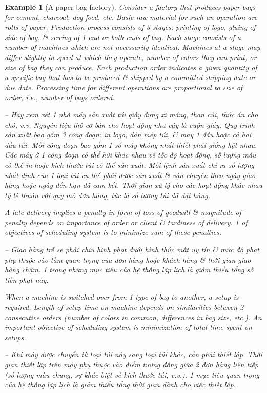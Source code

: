\documentclass{article}
\newtheorem{example}{Example}
\begin{document}
\begin{itemize}
\begin{itemize}
        \begin{example}[A paper bag factory]
            Consider a factory that produces paper bags for cement, charcoal, dog food, etc. Basic raw material for such an operation are rolls of paper. Production process consists of 3 stages: printing of logo, gluing of side of bag, \& sewing of 1 end or both ends of bag. Each stage consists of a number of machines which are not necessarily identical. Machines at a stage may differ slightly in speed at which they operate, number of colors they can print, or size of bag they can produce. Each production order indicates a given quantity of a specific bag that has to be produced \& shipped by a committed shipping date or due date. Processing time for different operations are proportional to size of order, i.e., number of bags ordered.

            -- Hãy xem xét 1 nhà máy sản xuất túi giấy đựng xi măng, than củi, thức ăn cho chó, v.v. Nguyên liệu thô cơ bản cho hoạt động như vậy là cuộn giấy. Quy trình sản xuất bao gồm 3 công đoạn: in logo, dán mép túi, \& may 1 đầu hoặc cả hai đầu túi. Mỗi công đoạn bao gồm 1 số máy không nhất thiết phải giống hệt nhau. Các máy ở 1 công đoạn có thể hơi khác nhau về tốc độ hoạt động, số lượng màu có thể in hoặc kích thước túi có thể sản xuất. Mỗi lệnh sản xuất chỉ ra số lượng nhất định của 1 loại túi cụ thể phải được sản xuất \& vận chuyển theo ngày giao hàng hoặc ngày đến hạn đã cam kết. Thời gian xử lý cho các hoạt động khác nhau tỷ lệ thuận với quy mô đơn hàng, tức là số lượng túi đã đặt hàng.

            A late delivery implies a penalty in form of loss of goodwill \& magnitude of penalty depends on importance of order or client \& tardiness of delivery. 1 of objectives of scheduling system is to minimize sum of these penalties.

            -- Giao hàng trễ sẽ phải chịu hình phạt dưới hình thức mất uy tín \& mức độ phạt phụ thuộc vào tầm quan trọng của đơn hàng hoặc khách hàng \& thời gian giao hàng chậm. 1 trong những mục tiêu của hệ thống lập lịch là giảm thiểu tổng số tiền phạt này.

            When a machine is switched over from 1 type of bag to another, a setup is required. Length of setup time on machine depends on similarities between 2 consecutive orders (number of colors in common, differences in bag size, etc.). An important objective of scheduling system is minimization of total time spent on setups.

            -- Khi máy được chuyển từ loại túi này sang loại túi khác, cần phải thiết lập. Thời gian thiết lập trên máy phụ thuộc vào điểm tương đồng giữa 2 đơn hàng liên tiếp (số lượng màu chung, sự khác biệt về kích thước túi, v.v.). 1 mục tiêu quan trọng của hệ thống lập lịch là giảm thiểu tổng thời gian dành cho việc thiết lập.
        \end{example}


\end{itemize}
\end{itemize}
\end{document}
